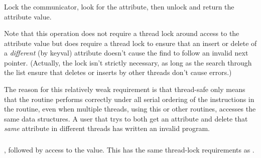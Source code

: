 \documentclass{article}
\begin{document}


\subsubsection{}
Lock the communicator, look for the attribute, then unlock and return
the attribute value.

Note that this operation does not require a thread lock around access
to the attribute value but does require a thread lock 
to ensure that an insert or delete of a
\emph{different} (by keyval) attribute doesn't cause the find to
follow an invalid next pointer. (Actually, the lock isn't strictly
necessary, as long as the search through the list ensure that deletes
or inserts by other threads don't cause errors.)

The reason for this relatively weak requirement is that thread-safe
only means that the routine performs correctly under all serial
ordering of the instructions in the routine, even when multiple
threads, using this or other routines, accesses the same data
structures.  A user that trys to both get an attribute and delete that
\emph{same} attribute in different threads has written an invalid program.



\subsubsection{}
, followed by access to the value.  This has
the same thread-lock requirements as .
\end{document}
